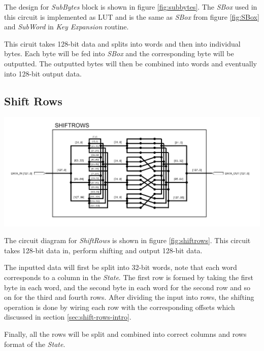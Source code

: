 \documentclass[a4paper, 10pt]{article}
\newenvironment{Figure}
    {\par\medskip\noindent\minipage{\linewidth}}
    {\endminipage\par\medskip}
\begin{document}
\begin{multicols}{2}
            The design for \textit{SubBytes} block is shown in figure \ref{fig:subbytes}. The \textit{SBox} used in this circuit is implemented as LUT and is the same as \textit{SBox} from figure \ref{fig:SBox} and \textit{SubWord} in \textit{Key Expansion} routine.

            This ciruit takes 128-bit data and splits into words and then into individual bytes. Each byte will be fed into \textit{SBox} and the corresponding byte will be outputted. The outputted bytes will then be combined into words and eventually into 128-bit output data.

            \subsection{Shift Rows}

            \noindent
            \begin{Figure}
                \centering
                \includegraphics[width=\linewidth]{ShiftRows.png}
                \label{fig:shiftrows}
            \end{Figure}

            The circuit diagram for \textit{ShiftRows} is shown in figure \ref{fig:shiftrows}. This circuit takes 128-bit data in, perform shifting and output 128-bit data.

            The inputted data will first be split into 32-bit words, note that each word corresponds to a column in the \textit{State}. The first row is formed by taking the first byte in each word, and the second byte in each word for the second row and so on for the third and fourth rows. After dividing the input into rows, the shifting operation is done by wiring each row with the corresponding offsets which discussed in section \ref{sec:shift-rows-intro}.

            Finally, all the rows will be split and combined into correct columns and rows format of the \textit{State}.


\end{multicols}
\end{document}
